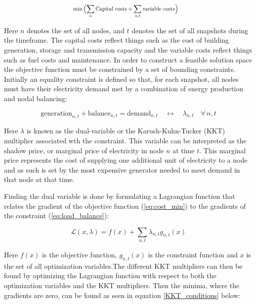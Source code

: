 \documentclass[preprint,12pt,nopreprintline]{elsarticle}
\begin{document}
\medskip
\noindent

\begin{equation}
  \scalebox{0.8}{$
    \begin{aligned}
      \min\,&\Bigl(\sum_{n}\text{Capital costs}
             +\sum_{n,t}\text{variable costs}\Bigr)
    \end{aligned}
  $}
  \label{eq:cost_min}
\end{equation}

\medskip
\noindent Here $n$ denotes the set of all nodes, and $t$ denotes the set of all snapshots during the timeframe. The capital costs reflect things such as the cost of building generation, storage and transmission capacity and the variable costs reflect things such as fuel costs and maintenance. In order to construct a feasible solution space the objective function must be constrained by a set of bounding constraints. Initially an equality constraint is defined so that, for each snapshot, all nodes must have their electricity demand met by a combination of energy production and nodal balancing:

\begin{equation}
\text{generation}_{n,t} + \text{balance}_{n,t}
= \text{demand}_{n,t}
\quad\longleftrightarrow\quad
\lambda_{n,t}
\quad\forall\,n,t
\label{eq:load_balance}
\end{equation}

\medskip
\noindent
Here $\lambda$ is known as the dual-variable or the Karush-Kuhn-Tucker (KKT) multiplier associated wth the constraint. This variable can be interpreted as the shadow price, or marginal price of electricity in node $n$ at time $t$. This marginal price represents the cost of supplying one additional unit of electricity to a node and as such is set by the most expensive generator needed to meet demand in that node at that time\cite{EnergyBalanceDocumentation}.

\medskip
\noindent
Finding the dual variable is done by formulating a Lagrangian function that relates the gradient of the objective function (\ref{eq:cost_min}) to the gradients of the constraint (\ref{eq:load_balance}):

\begin{equation}
\mathcal{L}(x, \lambda)
=
f(x)
+\sum_{n,t} \lambda_{n,t} g_{n,t}(x)
\label{Lagrangian}
\end{equation}

\medskip
\noindent
Here $f(x)$ is the objective function, $g_{n,t}(x)$ is the constraint function and $x$ is the set of all optimization variables.The different KKT multipliers can then be found by optimizing the Lagrangian function with respect to both the optimization variables and the KKT multipliers. Then the minima, where the gradients are zero, can be found as seen in equation \eqref{KKT_conditions} below:
\end{document}
